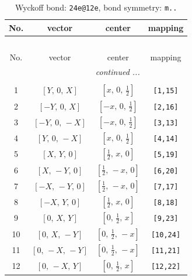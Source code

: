 \documentclass[fleqn,8pt]{jsarticle}
\begin{document}
\renewcommand{\arraystretch}{1.2}
\begin{longtable}{cccc}
\caption{Wyckoff bond: {\tt 24e@12e}, bond symmetry: {\tt m..}}
 \\
 \hline \hline
No. & vector & center & mapping \\ \hline \endfirsthead

\multicolumn{3}{l}{\tablename\ \thetable{}} \\
 \hline \hline
No. & vector & center & mapping \\ \hline \endhead

 \hline \hline
\multicolumn{3}{r}{\footnotesize\it continued ...} \\ \endfoot

 \hline \hline
\multicolumn{3}{r}{} \\ \endlastfoot

1 & $\left[ Y,\, 0,\, X \right]$ & $\left[ x,\, 0,\, \frac{1}{2} \right]$ & {\tt [1,15]} \\ \hline
2 & $\left[ - Y,\, 0,\, X \right]$ & $\left[ - x,\, 0,\, \frac{1}{2} \right]$ & {\tt [2,16]} \\ \hline
3 & $\left[ - Y,\, 0,\, - X \right]$ & $\left[ - x,\, 0,\, \frac{1}{2} \right]$ & {\tt [3,13]} \\ \hline
4 & $\left[ Y,\, 0,\, - X \right]$ & $\left[ x,\, 0,\, \frac{1}{2} \right]$ & {\tt [4,14]} \\ \hline
5 & $\left[ X,\, Y,\, 0 \right]$ & $\left[ \frac{1}{2},\, x,\, 0 \right]$ & {\tt [5,19]} \\ \hline
6 & $\left[ X,\, - Y,\, 0 \right]$ & $\left[ \frac{1}{2},\, - x,\, 0 \right]$ & {\tt [6,20]} \\ \hline
7 & $\left[ - X,\, - Y,\, 0 \right]$ & $\left[ \frac{1}{2},\, - x,\, 0 \right]$ & {\tt [7,17]} \\ \hline
8 & $\left[ - X,\, Y,\, 0 \right]$ & $\left[ \frac{1}{2},\, x,\, 0 \right]$ & {\tt [8,18]} \\ \hline
9 & $\left[ 0,\, X,\, Y \right]$ & $\left[ 0,\, \frac{1}{2},\, x \right]$ & {\tt [9,23]} \\ \hline
10 & $\left[ 0,\, X,\, - Y \right]$ & $\left[ 0,\, \frac{1}{2},\, - x \right]$ & {\tt [10,24]} \\ \hline
11 & $\left[ 0,\, - X,\, - Y \right]$ & $\left[ 0,\, \frac{1}{2},\, - x \right]$ & {\tt [11,21]} \\ \hline
12 & $\left[ 0,\, - X,\, Y \right]$ & $\left[ 0,\, \frac{1}{2},\, x \right]$ & {\tt [12,22]} \\
\end{longtable}
\end{document}
